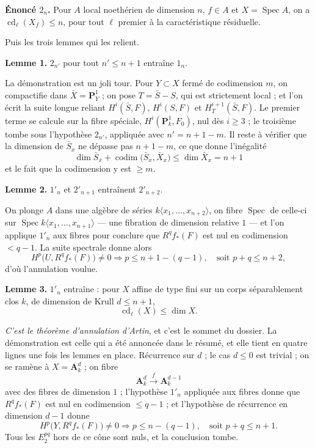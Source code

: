 \documentclass[11pt,a4paper]{article}
\begin{document}
\textbf{Énoncé $2_n$.} Pour $A$ local noethérien de dimension $n$, $f \in A$ et
$X = \operatorname{Spec} A$, on a $\operatorname{cd}_{\ell}(X_f) \leqslant n$,
pour tout $\ell$ premier à la caractéristique résiduelle.

Puis les trois lemmes qui les relient.

\textbf{Lemme 1.} $2_{n'}$ pour tout $n' \leqslant n+1$ entraîne $1_n$.

La démonstration est un joli tour. Pour $Y \subset X$ fermé de codimension $m$,
on compactifie dans $\bar{X} = \mathbf{P}^1_Y$ ; on pose $T = \bar{S} - S$, qui
est strictement local ; et l'on écrit la suite longue reliant $H^i(\bar{S},F)$,
$H^i(S,F)$ et $H^{i+1}_T(\bar{S},F)$. Le premier terme se calcule sur la fibre
spéciale, $H^i(\mathbf{P}^1_k, F_0)$, nul dès $i \geqslant 3$ ; le troisième
tombe sous l'hypothèse $2_{n'}$, appliquée avec $n' = n+1-m$. Il reste à
vérifier que la dimension de $\bar{S}_x$ ne dépasse pas $n+1-m$, ce que donne
l'inégalité
\[
\dim \bar{S}_x + \operatorname{codim}\bigl(\bar{S}_x, \bar{X}_x\bigr)
\leqslant \dim \bar{X}_x = n+1
\]
et le fait que la codimension y est $\geqslant m$.

\textbf{Lemme 2.} $1'_n$ et $2'_{n+1}$ entraînent $2'_{n+2}$.

On plonge $A$ dans une algèbre de séries $k\langle x_1, \dots, x_{n+2}\rangle$,
on fibre $\operatorname{Spec}$ de celle-ci sur
$\operatorname{Spec} k\langle x_1, \dots, x_{n+1}\rangle$ — une fibration de
dimension relative $1$ — et l'on applique $1'_n$ aux fibres pour conclure que
$R^q f_{*}(F)$ est nul en codimension $< q-1$. La suite spectrale donne alors
\[
H^p\bigl(U, R^q f_{*}(F)\bigr) \neq 0 \Longrightarrow
p \leqslant n+1-(q-1), \quad \text{soit } p+q \leqslant n+2,
\]
d'où l'annulation voulue.

\textbf{Lemme 3.} $1'_n$ entraîne : pour $X$ affine de type fini sur un corps
séparablement clos $k$, de dimension de Krull $d \leqslant n+1$,
\[
\operatorname{cd}_{\ell}(X) \leqslant \dim X.
\]

\emph{C'est le théorème d'annulation d'Artin}, et c'est le sommet du dossier.
La démonstration est celle qui a été annoncée dans le résumé, et elle tient en
quatre lignes une fois les lemmes en place. Récurrence sur $d$ ; le cas
$d \leqslant 0$ est trivial ; on se ramène à $X = \mathbf{A}^d_k$ ; on fibre
\[
\mathbf{A}^d_k \xrightarrow{\ f\ } \mathbf{A}^{d-1}_k
\]
avec des fibres de dimension $1$ ; l'hypothèse $1'_n$ appliquée aux fibres donne
que $R^q f_{*}(F)$ est nul en codimension $\leqslant q-1$ ; et l'hypothèse de
récurrence en dimension $d-1$ donne
\[
H^p\bigl(Y, R^q f_{*}(F)\bigr) \neq 0 \Longrightarrow p \leqslant n-(q-1),
\quad \text{soit } p+q \leqslant n+1 .
\]
Tous les $E_2^{pq}$ hors de ce cône sont nuls, et la conclusion tombe.
\end{document}
